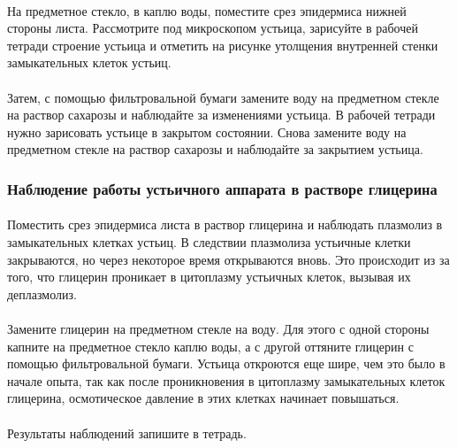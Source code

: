 \paragraph*{}На предметное стекло, в каплю воды, поместите срез эпидермиса нижней стороны листа. Рассмотрите под микроскопом устьица, зарисуйте в рабочей тетради строение устьица и отметить на рисунке утолщения внутренней стенки замыкательных клеток устьиц. 

\paragraph*{}Затем, с помощью фильтровальной бумаги замените воду на предметном стекле на раствор сахарозы и наблюдайте за изменениями устьица. В рабочей тетради нужно зарисовать устьице в закрытом состоянии. Снова замените воду на предметном стекле на раствор сахарозы и наблюдайте за закрытием устьица.

\subsubsection*{Наблюдение работы устьичного аппарата в растворе глицерина}

\paragraph*{}Поместить срез эпидермиса листа в раствор глицерина и наблюдать плазмолиз в замыкательных клетках устьиц. В следствии плазмолиза устьичные клетки закрываются, но через некоторое время открываются вновь. Это происходит из за того, что глицерин проникает в цитоплазму устьичных клеток, вызывая их деплазмолиз.

\paragraph*{}Замените глицерин на предметном стекле на воду. Для этого с одной стороны капните на предметное стекло каплю воды, а с другой оттяните глицерин с помощью фильтровальной бумаги. Устьица откроются еще шире, чем это было в начале опыта, так как после проникновения в цитоплазму замыкательных клеток глицерина, осмотическое давление в этих клетках начинает повышаться.

\paragraph*{}Результаты наблюдений запишите в тетрадь.

